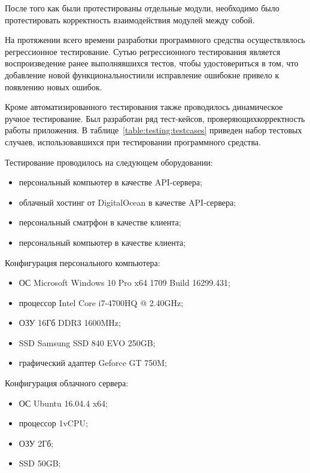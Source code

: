 После того как были протестированы отдельные модули, необходимо было  протестировать  корректность  взаимодействия  модулей  между  собой. 

На протяжении всего времени разработки программного средства осуществлялось регрессионное тестирование. Сутью регрессионного тестирования является воспроизведение ранее выполнявшихся тестов, чтобы удостовериться  в  том,  что  добавление  новой  функциональностиили  исправление ошибокне привело к появлению новых ошибок.

Кроме  автоматизированного  тестирования  также  проводилось динамическое ручное тестирование. Был  разработан  ряд  тест-кейсов, проверяющихкорректность работы приложения. В таблице~\ref{table:testing:testcases}  приведен набор тестовых случаев, использовавшихся при тестировании программного средства.

Тестирование проводилось на следующем оборудовании:

\begin{itemize}
	\item персональный компьютер в качестве API-сервера;
	\item облачный хостинг от DigitalOcean в качестве API-сервера;
	\item персональный сматрфон в качестве клиента;
	\item персональный компьютер в качестве клиента;
\end{itemize}

Конфигурация персонального компьютера:

\begin{itemize}
	\item ОС Microsoft Windows 10 Pro x64 1709 Build 16299.431;
	\item процессор Intel Core i7-4700HQ @ 2.40GHz;
	\item ОЗУ 16Гб DDR3 1600MHz;
	\item SSD Samsung SSD 840 EVO 250GB;
	\item графический адаптер Geforce GT 750M;
\end{itemize}

Конфигурация облачного сервера:

\begin{itemize}
	\item ОС Ubuntu 16.04.4 x64;
	\item процессор 1vCPU;
	\item ОЗУ 2Гб;
	\item SSD 50GB;
\end{itemize}

